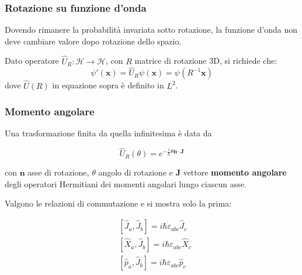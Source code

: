 \documentclass[10pt, a4paper]{scrartcl}
\numberwithin{equation}{subsection}
\theoremstyle{style1}
\newenvironment{boxenv}[1][]{
    \begin{eqbox}[#1]
    }{
   \end{eqbox}
}
\begin{document}
\subsubsection{Rotazione su funzione d'onda}

Dovendo rimanere la probabilit\`a invariata sotto rotazione, la funzione d'onda non deve cambiare valore dopo rotazione dello spazio. 

Dato operatore $\hat{U}_R:\mathcal{H}\to \mathcal{H}$, con $R$ matrice di rotazione 3D, si richiede che:
\begin{equation}
	\psi '(\mathbf{x} )= \hat{U}_R \psi (\mathbf{x} ) = \psi (R^{-1} \mathbf{x} )
\end{equation}
dove $\hat{U}(R)$ in equazione sopra \`e definito in $L^{2} $.

\subsubsection{Momento angolare}
Una trasformazione finita da quella infinitesima \`e data da
\begin{boxenv}[]
\begin{equation}
	\hat{U}_R(\theta ) = e^{-\frac{i}{\hbar }\theta \mathbf{n} \cdot \mathbf{J} } 
\end{equation}
\end{boxenv}
\noindent con $\mathbf{n} $ asse di rotazione, $\theta $ angolo di rotazione e \textbf{J} vettore \textbf{momento angolare} degli operatori Hermitiani dei momenti angolari lungo ciascun asse.

Valgono le relazioni di commutazione e si mostra solo la prima:
\begin{boxenv}[]
\begin{equation}
	\begin{split}
		&[\hat{J}_a, \hat{J}_b] = i\hbar \varepsilon _{abc} \hat{J}_c\\
		& [\hat{X}_a , \hat{J}_b] = i \hbar \varepsilon _{abc} \hat{X}_c\\
		& [\hat{p}_a , \hat{J}_b] = i \hbar \varepsilon _{abc} \hat{p}_c
	\end{split}
\end{equation}
\end{boxenv}
\end{document}

